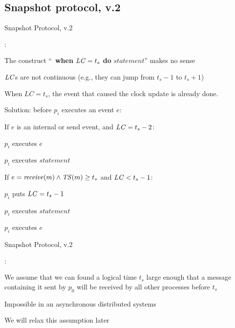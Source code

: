 \subsection{Snapshot protocol, v.2}


\begin{frame}{Snapshot Protocol, v.2}

:

\BIL
\item The construct ``~{\bf when} $\mathit{LC}=t_s$ {\bf do} $\mathit{statement}$'' makes no sense
  \BI
  \item $\mathit{LC}$s are not continuous (e.g., they can jump from $t_s-1$ to $t_s+1$)
  \item When $LC=t_s$, the event that caused the clock update is already done.
  \EI
\item  Solution: before $p_i$ executes an event $e$:
  \BI
  \item If $e$ is an internal or send event, and $\mathit{LC} = t_s-2$:
    \BI
      \item $p_i$ executes $e$
      \item $p_i$ executes $\mathit{statement}$
    \EI
  \item If $e=\mathit{receive}(m) \wedge \mathit{TS}(m) \geq t_s$ and $\mathit{LC} < t_s-1$:
	\BI
	\item $p_i$ puts $\mathit{LC}=t_s-1$
	\item $p_i$ executes $\mathit{statement}$
	\item $p_i$ executes $e$
	\EI
  \EI
\EIL

\end{frame}



\begin{frame}{Snapshot Protocol, v.2}

:

\BI
\item We assume that we can found a logical time $t_s$ large
  enough that a message containing it sent by $p_0$ will be 
  received by all other processes before $t_s$
\item Impossible in an asynchronous distributed systems
\item We will relax this assumption later
\EI
\end{frame}


